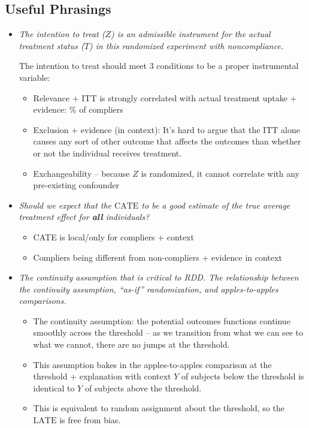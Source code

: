 \documentclass[10pt, letterpaper]{article}
\def\LATE{\mathrm{LATE}}
\def\CATE{\mathrm{CATE}}
\def\ITT{\mathrm{ITT}}
\begin{document}
\begin{multicols}{2}
\section*{Useful Phrasings}
\begin{itemize}
	\item \textit{The intention to treat ($Z$) is an admissible instrument for the actual treatment status ($T$) in this randomized experiment with noncompliance.} \par The intention to treat should meet $3$ conditions to be a proper instrumental variable:
	\begin{itemize}
		\item Relevance + ITT is strongly correlated with actual treatment uptake + evidence: \% of compliers
		\item Exclusion + evidence (in context): It’s hard to argue that the $\ITT$ alone causes any sort of other outcome that affects the outcomes than whether or not the individual receives treatment.
		\item Exchangeability – because $Z$ is randomized, it cannot correlate with any pre-existing confounder
	\end{itemize}
	\item \textit{Should we expect that the $\CATE$ to be a good estimate of the true average treatment effect for \textbf{all} individuals?}
	\begin{itemize}
		\item CATE is local/only for compliers + context
		\item Compliers being different from non-compliers + evidence in context
	\end{itemize}
	\item \textit{The continuity assumption that is critical to RDD. The relationship between the continuity assumption, ``as-if'' randomization, and apples-to-apples comparisons.}
	\begin{itemize}
		\item The continuity assumption: the potential outcomes functions continue smoothly across the threshold – as we transition from what we can see to what we cannot, there are no jumps at the threshold.
		\item This assumption bakes in the apples-to-apples comparison at the threshold + explanation with context $Y$ of subjects below the threshold is identical to $Y$ of subjects above the threshold.
		\item This is equivalent to random assignment about the threshold, so the $\LATE$ is free from bias.

\end{itemize}
\end{itemize}
\end{multicols}
\end{document}
